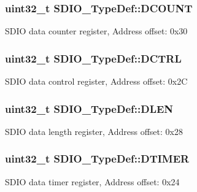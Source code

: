 \subsubsection[{\texorpdfstring{D\+C\+O\+U\+NT}{DCOUNT}}]{ uint32\+\_\+t S\+D\+I\+O\+\_\+\+Type\+Def\+::\+D\+C\+O\+U\+NT}\hypertarget{struct_s_d_i_o___type_def_a0366564e2795952d520c0de4be70020f}{}\label{struct_s_d_i_o___type_def_a0366564e2795952d520c0de4be70020f}
S\+D\+IO data counter register, Address offset\+: 0x30 
\subsubsection[{\texorpdfstring{D\+C\+T\+RL}{DCTRL}}]{ uint32\+\_\+t S\+D\+I\+O\+\_\+\+Type\+Def\+::\+D\+C\+T\+RL}\hypertarget{struct_s_d_i_o___type_def_a801519a7af801ad43b88007bf4e2e906}{}\label{struct_s_d_i_o___type_def_a801519a7af801ad43b88007bf4e2e906}
S\+D\+IO data control register, Address offset\+: 0x2C 
\subsubsection[{\texorpdfstring{D\+L\+EN}{DLEN}}]{ uint32\+\_\+t S\+D\+I\+O\+\_\+\+Type\+Def\+::\+D\+L\+EN}\hypertarget{struct_s_d_i_o___type_def_aa98ab507ed05468ca4baccd1731231cd}{}\label{struct_s_d_i_o___type_def_aa98ab507ed05468ca4baccd1731231cd}
S\+D\+IO data length register, Address offset\+: 0x28 
\subsubsection[{\texorpdfstring{D\+T\+I\+M\+ER}{DTIMER}}]{ uint32\+\_\+t S\+D\+I\+O\+\_\+\+Type\+Def\+::\+D\+T\+I\+M\+ER}\hypertarget{struct_s_d_i_o___type_def_a5af1984c7c00890598ca74fc85449f9f}{}\label{struct_s_d_i_o___type_def_a5af1984c7c00890598ca74fc85449f9f}
S\+D\+IO data timer register, Address offset\+: 0x24 

